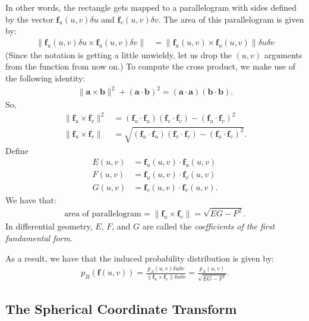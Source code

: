 \documentclass[10pt]{article}
\newcommand{\ve}[1]{\mathbf{#1}}
\begin{document}
  In other words, the rectangle gets mapped to a parallelogram with sides defined by the vector $\ve{f}_u(u,v) \delta u$ and $\ve{f}_v(u,v) \delta v$.  The area of this parallelogram is given by:
  \begin{align*}
    \| \ve{f}_u(u,v) \delta u \times \ve{f}_u(u,v) \delta v \| 
    &= \| \ve{f}_u(u,v) \times \ve{f}_u(u,v) \| \delta u \delta v    
  \end{align*}
  (Since the notation is getting a little unwieldy, let us drop the $(u,v)$ arguments from the function from now on.)  To compute the cross product, we make use of the following identity:
  \begin{align*}
    \| \ve{a} \times \ve{b} \|^2 + (\ve{a} \cdot \ve{b})^2 = (\ve{a} \cdot \ve{a}) (\ve{b} \cdot \ve{b}).
  \end{align*}
  So,
  \begin{align*}
    \| \ve{f}_u \times \ve{f}_v \|^2 &= (\ve{f}_u \cdot \ve{f}_u) (\ve{f}_v \cdot \ve{f}_v) - (\ve{f}_u \cdot \ve{f}_v)^2 \\
    \| \ve{f}_u \times \ve{f}_v \| &= \sqrt{ (\ve{f}_u \cdot \ve{f}_u) (\ve{f}_v \cdot \ve{f}_v) - (\ve{f}_u \cdot \ve{f}_v)^2 }.
  \end{align*}
  Define
  \begin{align*}
    E(u,v) &= \ve{f}_u(u,v) \cdot \ve{f}_u(u,v) \\
    F(u,v) &= \ve{f}_u(u,v) \cdot \ve{f}_v(u,v) \\
    G(u,v) &= \ve{f}_v(u,v) \cdot \ve{f}_v(u,v).
  \end{align*}
  We have that:
  \begin{align*}
    \mbox{area of parallelogram} = \| \ve{f}_u \times \ve{f}_v \| = \sqrt{EG - F^2}.
  \end{align*}
  In differential geometry, $E$, $F$, and $G$ are called the \emph{coefficients of the first fundamental form}.

  As a result, we have that the induced probability distribution is given by:
  \begin{align*}
    p_B(\ve{f}(u,v)) = \frac{p_A(u,v) \delta u \delta v}{\| \ve{f}_u \times \ve{f}_v\| \delta u \delta v} = \frac{p_A(u,v)}{\sqrt{EG - F^2}}.
  \end{align*}

  \subsection{The Spherical Coordinate Transform}
\end{document}
